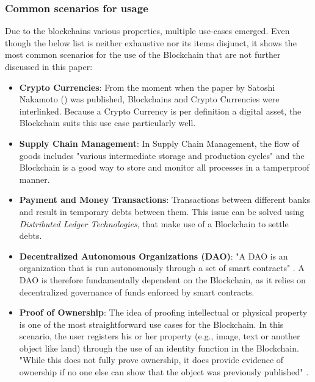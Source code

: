 \subsubsection{Common scenarios for usage}
Due to the blockchains various properties, multiple use-cases emerged. Even though the below list is neither exhaustive nor its items disjunct, it shows the most common scenarios for the use of the Blockchain \cite{Wust2017} that are not further discussed in this paper:
\begin{itemize}
  \item \textbf{Crypto Currencies}: From the moment when the paper by Satoshi Nakamoto (\cite{Nakamoto2009}) was published, Blockchains and Crypto Currencies were interlinked. Because a Crypto Currency is per definition a digital asset, the Blockchain suits this use case particularly well.
  \item \textbf{Supply Chain Management}: In Supply Chain Management, the flow of goods includes "various intermediate storage and production cycles" \cite{Wust2017} and the Blockchain is a good way to store and monitor all processes in a tamperproof manner.
  \item \textbf{Payment and Money Transactions}: Transactions between different banks and result in temporary debts between them. This issue can be solved using \textit{Distributed Ledger Technologies}, that make use of a Blockchain to settle debts.
  \item \textbf{Decentralized Autonomous Organizations (DAO)}: "A DAO is an organization that is run autonomously through a set of smart contracts" \cite{Wust2017}. A DAO is therefore fundamentally dependent on the Blockchain, as it relies on decentralized governance of funds enforced by smart contracts.
  \item \textbf{Proof of Ownership}: The idea of proofing intellectual or physical property is one of the most straightforward use cases for the Blockchain. In this scenario, the user registers his or her property (e.g., image, text or another object like land) through the use of an identity function in the Blockchain. "While this does not fully prove ownership, it does provide evidence of ownership if no one else can show that the object was previously published" \cite{Wust2017}.
\end{itemize}

